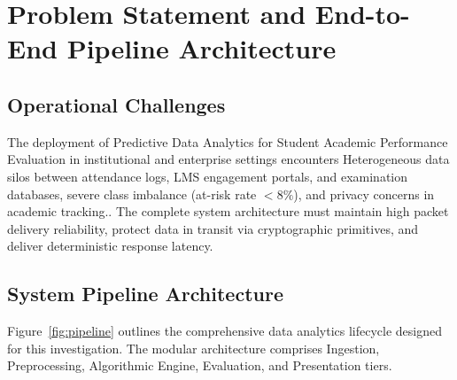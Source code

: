 \section{Problem Statement and End-to-End Pipeline Architecture}

\subsection{Operational Challenges}
The deployment of Predictive Data Analytics for Student Academic Performance Evaluation in institutional and enterprise settings encounters Heterogeneous data silos between attendance logs, LMS engagement portals, and examination databases, severe class imbalance (at-risk rate $< 8\%$), and privacy concerns in academic tracking.. The complete system architecture must maintain high packet delivery reliability, protect data in transit via cryptographic primitives, and deliver deterministic response latency.

\subsection{System Pipeline Architecture}
Figure~\ref{fig:pipeline} outlines the comprehensive data analytics lifecycle designed for this investigation. The modular architecture comprises Ingestion, Preprocessing, Algorithmic Engine, Evaluation, and Presentation tiers.

